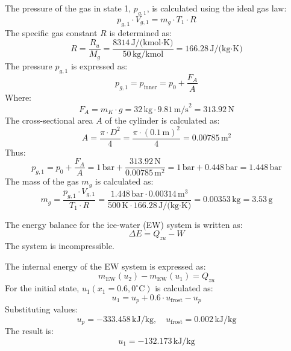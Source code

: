 The pressure of the gas in state 1, \( p_{g,1} \), is calculated using the ideal gas law:  
\[
p_{g,1} \cdot V_{g,1} = m_g \cdot T_1 \cdot R
\]  
The specific gas constant \( R \) is determined as:  
\[
R = \frac{R_u}{M_g} = \frac{8314 \, \text{J/(kmol·K)}}{50 \, \text{kg/kmol}} = 166.28 \, \text{J/(kg·K)}
\]  
The pressure \( p_{g,1} \) is expressed as:  
\[
p_{g,1} = p_{\text{inner}} = p_0 + \frac{F_A}{A}
\]  
Where:  
\[
F_A = m_K \cdot g = 32 \, \text{kg} \cdot 9.81 \, \text{m/s}^2 = 313.92 \, \text{N}
\]  
The cross-sectional area \( A \) of the cylinder is calculated as:  
\[
A = \frac{\pi \cdot D^2}{4} = \frac{\pi \cdot (0.1 \, \text{m})^2}{4} = 0.00785 \, \text{m}^2
\]  
Thus:  
\[
p_{g,1} = p_0 + \frac{F_A}{A} = 1 \, \text{bar} + \frac{313.92 \, \text{N}}{0.00785 \, \text{m}^2} = 1 \, \text{bar} + 0.448 \, \text{bar} = 1.448 \, \text{bar}
\]  
The mass of the gas \( m_g \) is calculated as:  
\[
m_g = \frac{p_{g,1} \cdot V_{g,1}}{T_1 \cdot R} = \frac{1.448 \, \text{bar} \cdot 0.00314 \, \text{m}^3}{500 \, \text{K} \cdot 166.28 \, \text{J/(kg·K)}} = 0.00353 \, \text{kg} = 3.53 \, \text{g}
\]

The energy balance for the ice-water (EW) system is written as:  
\[
\Delta E = Q_{zu} - W
\]  
The system is incompressible.  

The internal energy of the EW system is expressed as:  
\[
m_{\text{EW}}(u_2) - m_{\text{EW}}(u_1) = Q_{zu}
\]  
For the initial state, \( u_1(x_1 = 0.6, 0^\circ\text{C}) \) is calculated as:  
\[
u_1 = u_p + 0.6 \cdot u_{\text{frost}} - u_p
\]  
Substituting values:  
\[
u_p = -333.458 \, \text{kJ/kg}, \quad u_{\text{frost}} = 0.002 \, \text{kJ/kg}
\]  
The result is:  
\[
u_1 = -132.173 \, \text{kJ/kg}
\]